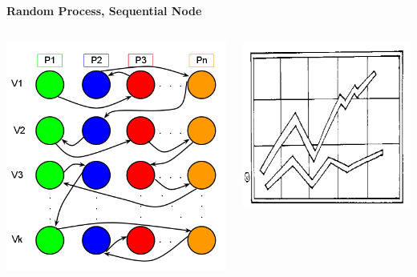 \documentclass[final]{beamer}
\begin{document}
\begin{frame}[t]
\begin{columns}[t]
\begin{column}{0.60\paperwidth}
\begin{columns}[t,totalwidth=0.60\paperwidth]
					\begin{column}{0.28\paperwidth}
						\begin{center} \bf{Random Process, Sequential Node} \end{center}
						\begin{columns}[t,totalwidth=0.28\paperwidth]
							\begin{column}{0.12\paperwidth}
								\begin{center} \includegraphics[width=0.12\paperwidth]{img/linked_list/rand_proc_seq_node} \end{center}
							\end{column}
							\begin{column}{0.12\paperwidth}
								\begin{center} \includegraphics[width=0.12\paperwidth]{img/temp} \end{center}

\end{column}
\end{columns}
\end{column}
\end{columns}
\end{column}
\end{columns}
\end{frame}
\end{document}
